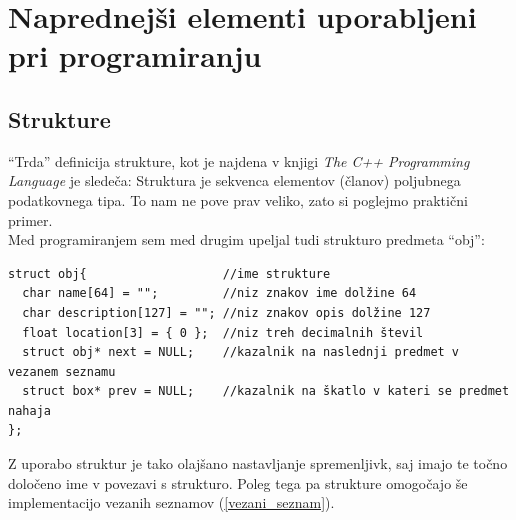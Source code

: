 \documentclass[12pt, a4paper, notitlepage]{article}
\begin{document}
  \section{Naprednejši elementi uporabljeni pri programiranju}
    \subsection{Strukture}
      ``Trda'' definicija strukture, kot je najdena v knjigi \textit{The C++ Programming Language}\cite{cpplang} je sledeča: Struktura je sekvenca elementov (članov) poljubnega podatkovnega tipa. To nam ne pove prav veliko, zato si poglejmo praktični primer.\\
      Med programiranjem sem med drugim upeljal tudi strukturo predmeta ``obj'':
      \begin{verbatim}
struct obj{                   //ime strukture
  char name[64] = "";         //niz znakov ime dolžine 64
  char description[127] = ""; //niz znakov opis dolžine 127
  float location[3] = { 0 };  //niz treh decimalnih števil
  struct obj* next = NULL;    //kazalnik na naslednji predmet v vezanem seznamu
  struct box* prev = NULL;    //kazalnik na škatlo v kateri se predmet nahaja
};
      \end{verbatim}
      Z uporabo struktur je tako olajšano nastavljanje spremenljivk, saj imajo te točno določeno ime v povezavi s strukturo. Poleg tega pa strukture omogočajo še implementacijo vezanih seznamov (\ref{vezani_seznam}).
\end{document}
